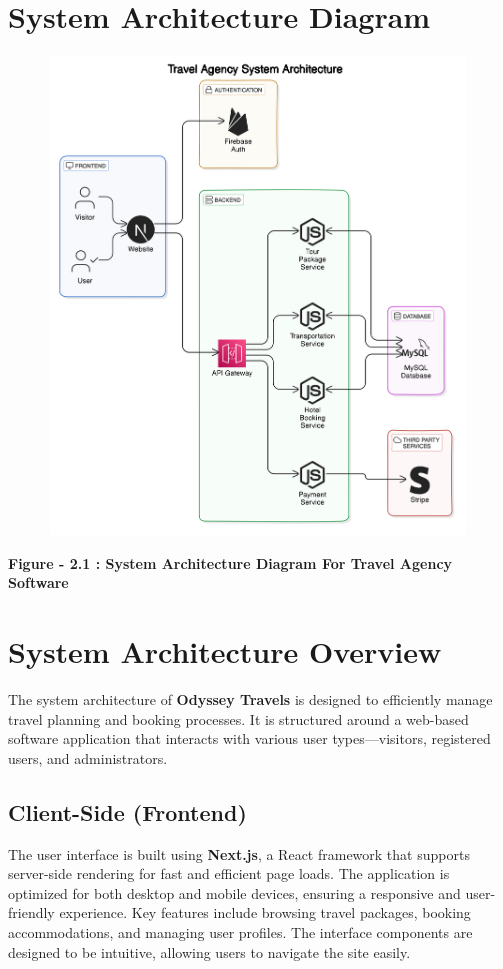 \documentclass{scrreprt}
\begin{document}
\section{System Architecture Diagram}

{\includegraphics[width=500px, height=480px]{SAD.png}}

\begin{center}
    \parbox{0.8\textwidth}{ 
        \centering
        \textbf{Figure - 2.1 : System Architecture Diagram For Travel Agency Software}
    }
\end{center}

\section{System Architecture Overview}

The system architecture of \textbf{Odyssey Travels} is designed to efficiently manage travel planning and booking processes. It is structured around a web-based software application that interacts with various user types—visitors, registered users, and administrators.

\subsection{Client-Side (Frontend)}
The user interface is built using \textbf{Next.js}, a React framework that supports server-side rendering for fast and efficient page loads. The application is optimized for both desktop and mobile devices, ensuring a responsive and user-friendly experience. Key features include browsing travel packages, booking accommodations, and managing user profiles. The interface components are designed to be intuitive, allowing users to navigate the site easily.
\end{document}
